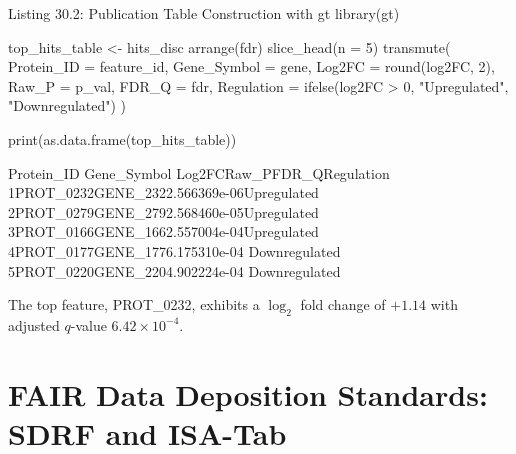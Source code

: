 \documentclass[11pt,twoside,openright]{book}
\begin{document}
\begin{rchunk}{Listing 30.2: Publication Table Construction with gt}
library(gt)

top_hits_table <- hits_disc %
  arrange(fdr) %
  slice_head(n = 5) %
  transmute(
    Protein_ID  = feature_id,
    Gene_Symbol = gene,
    Log2FC      = round(log2FC, 2),
    Raw_P       = p_val,
    FDR_Q       = fdr,
    Regulation  = ifelse(log2FC > 0, "Upregulated", "Downregulated")
  )

print(as.data.frame(top_hits_table))
\end{rchunk}

\begin{routput}
\enspace\enspace Protein\_ID Gene\_Symbol Log2FC\enspace\enspace\enspace\enspace\enspace\enspace\enspace Raw\_P\enspace\enspace\enspace\enspace\enspace\enspace\enspace\enspace FDR\_Q\enspace\enspace\enspace Regulation\\
1\enspace PROT\_0232\enspace\enspace\enspace GENE\_232\enspace{}\enspace 2.566369e-06\enspace\enspace Upregulated\\
2\enspace PROT\_0279\enspace\enspace\enspace GENE\_279\enspace{}\enspace 2.568460e-05\enspace\enspace Upregulated\\
3\enspace PROT\_0166\enspace\enspace\enspace GENE\_166\enspace{}\enspace 2.557004e-04\enspace\enspace Upregulated\\
4\enspace PROT\_0177\enspace\enspace\enspace GENE\_177\enspace 6.175310e-04 Downregulated\\
5\enspace PROT\_0220\enspace\enspace\enspace GENE\_220\enspace 4.902224e-04 Downregulated
\end{routput}

The top feature, PROT\_0232, exhibits a $\log_2$ fold change of $+1.14$ with adjusted $q$-value $6.42 \times 10^{-4}$.

\FloatBarrier
\section{FAIR Data Deposition Standards: SDRF and ISA-Tab}
\label{sec:fair_deposition}
\end{document}
